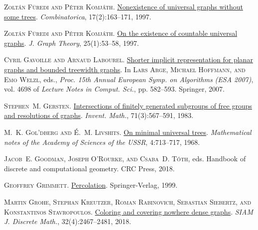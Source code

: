 \documentclass[a4paper,11pt]{article}
\theoremstyle{plain}
\theoremstyle{definition}
\begin{document}
\textsc{Zolt{\'a}n F\"{u}redi and P\'{e}ter Komj\'{a}th}.
\newblock \href{https://doi.org/10.1007/BF01200905}{Nonexistence of universal
  graphs without some trees}.
\newblock \emph{Combinatorica}, 17(2):163--171, 1997{}.

\textsc{Zolt\'{a}n F\"{u}redi and P\'{e}ter Komj\'{a}th}.
\newblock
  \href{https://doi.org/10.1002/(SICI)1097-0118(199705)25:1<53::AID-JGT3>3.3.CO;2-U}{On
  the existence of countable universal graphs}.
\newblock \emph{J. Graph Theory}, 25(1):53--58, 1997{}.

\textsc{Cyril Gavoille and Arnaud Labourel}.
\newblock \href{https://doi.org/10.1007/978-3-540-75520-3\_52}{Shorter implicit
  representation for planar graphs and bounded treewidth graphs}.
\newblock In \textsc{Lars Arge, Michael Hoffmann, and Emo Welzl}, eds.,
  \emph{Proc. 15th Annual European Symp. on Algorithms ({ESA 2007})}, vol. 4698
  of \emph{Lecture Notes in Comput. Sci.}, pp. 582--593. Springer, 2007.

\textsc{Stephen~M. Gersten}.
\newblock \href{https://doi.org/10.1007/BF02095994}{Intersections of finitely
  generated subgroups of free groups and resolutions of graphs}.
\newblock \emph{Invent. Math.}, 71(3):567--591, 1983.

\textsc{M.~K. Gol'dberg and \'E.~M. Livshits}.
\newblock \href{https://doi.org/10.1007/BF01116454}{On minimal universal
  trees}.
\newblock \emph{Mathematical notes of the Academy of Sciences of the USSR},
  4:713--717, 1968.

\textsc{Jacob~E. Goodman, Joseph O'Rourke, and Csaba~D. T\'{o}th}, eds.
\newblock Handbook of discrete and computational geometry.
\newblock CRC Press, 2018.

\textsc{Geoffrey Grimmett}.
\newblock \href{https://doi.org/10.1007/978-3-662-03981-6}{Percolation}.
\newblock Springer-Verlag, 1999.

\textsc{Martin Grohe, Stephan Kreutzer, Roman Rabinovich, Sebastian Siebertz,
  and Konstantinos Stavropoulos}.
\newblock \href{https://doi.org/10.1137/18M1168753}{Coloring and covering
  nowhere dense graphs}.
\newblock \emph{SIAM J. Discrete Math.}, 32(4):2467--2481, 2018.
\end{document}
